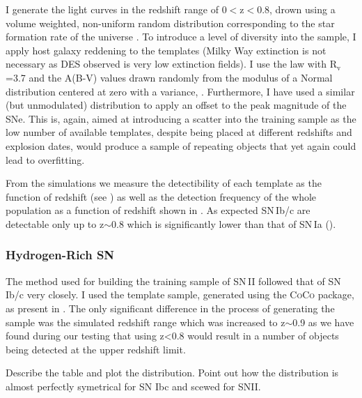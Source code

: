 I generate the light curves in the redshift range of 0$<$z$<$0.8, drown using a volume weighted, non-uniform random distribution corresponding to the star formation rate of the universe \citep{Hopkins2006}. To introduce a level of diversity into the sample, I apply host galaxy reddening to the templates (Milky Way extinction is not necessary as DES observed is very low extinction fields). I use the \citet{Cardelli1989} law with R$_\mathrm{v}$=3.7 and the A(B-V) values drawn randomly from the modulus of a Normal distribution centered at zero with a variance, . Furthermore, I have used a similar (but unmodulated) distribution to apply an offset to the peak magnitude of the SNe. This is, again, aimed at introducing a scatter into the training sample as the low number of available templates, despite being placed at different redshifts and explosion dates, would produce a sample of repeating objects that yet again could lead to overfitting.

From the simulations we measure the detectibility of each template as the function of redshift (see ) as well as the detection frequency of the whole population as a function of redshift shown in . As expected SN\,Ib/c are detectable only up to z$\sim$0.8 which is significantly lower than that of SN\,Ia ().

\begin{figure}
  \caption{}
  \label{fig:IbcDist}
\end{figure}

\subsubsection{Hydrogen-Rich SN}
The method used for building the training sample of SN\,II followed that of SN\,Ib/c very closely. I used the template sample, generated using the \textsc{CoCo} package, as present in . The only significant difference in the process of generating the sample was the simulated redshift range which was increased to z$\sim$0.9 as we have found during our testing that using z<0.8 would result in a number of objects being detected at the upper redshift limit.

\begin{table}
  \caption{}
  \label{tab:SNIITemplates}

\end{table}

Describe the table and plot the distribution. Point out how the distribution is almost perfectly symetrical for SN Ibc and scewed for SNII.

